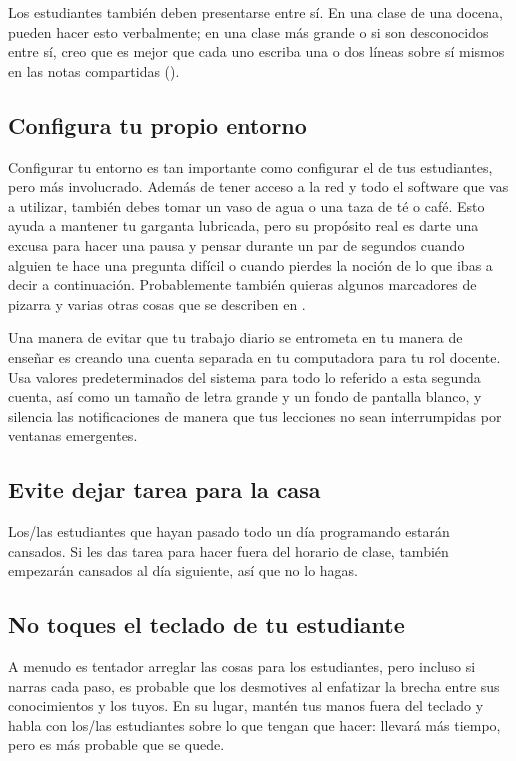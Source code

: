 Los estudiantes también deben presentarse entre sí.
En una clase de una docena,
pueden hacer esto verbalmente;
en una clase más grande o si son desconocidos entre sí,
creo que es mejor que cada uno escriba una o dos líneas sobre sí mismos en las notas compartidas ().

\subsection*{Configura tu propio entorno}

Configurar tu entorno es tan importante como configurar el de tus estudiantes,
pero más involucrado.
Además de tener acceso a la red y todo el software que vas a utilizar,
también debes tomar un vaso de agua
o una taza de té o café.
Esto ayuda a mantener tu garganta lubricada,
pero su propósito real es darte una excusa para hacer una pausa y pensar durante un par de segundos
cuando alguien te hace una pregunta difícil
o cuando pierdes la noción de lo que ibas a decir a continuación.
Probablemente también quieras algunos marcadores de pizarra
y varias otras cosas que se describen en .

Una manera de evitar que tu trabajo diario se entrometa en tu manera de enseñar
es creando una cuenta separada en tu computadora para tu rol docente.
Usa valores predeterminados del sistema para todo lo referido a esta segunda cuenta, 
así como un tamaño de letra grande y un fondo de pantalla blanco,
y silencia las notificaciones de manera que tus lecciones no sean interrumpidas por 
ventanas emergentes.
\subsection*{Evite dejar tarea para la casa}

Los/las estudiantes que hayan pasado todo un día programando estarán cansados.
Si les das tarea para hacer fuera del horario de clase,
también empezarán cansados al día siguiente,
así que no lo hagas.

\subsection*{No toques el teclado de tu estudiante}

A menudo es tentador arreglar las cosas para los estudiantes,
pero incluso si narras cada paso,
es probable que los desmotives
al enfatizar la brecha entre sus conocimientos y los tuyos.
En su lugar,
mantén tus manos fuera del teclado y habla con los/las estudiantes sobre lo que tengan que hacer:
llevará más tiempo,
pero es más probable que se quede.

